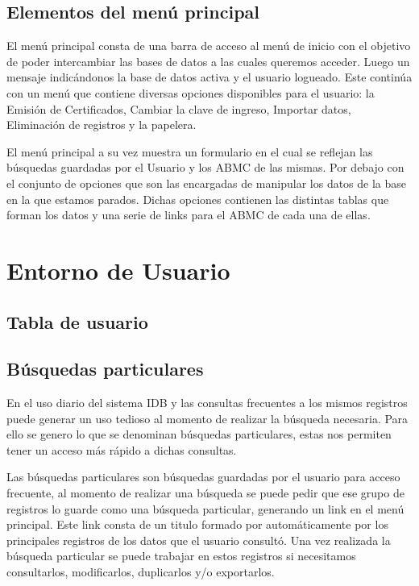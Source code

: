 \documentclass[a4paper,10pt]{article}
\begin{document}
\subsection{Elementos del menú principal}
El menú principal consta de una barra de acceso al menú de inicio con el objetivo de poder intercambiar las bases de datos a las cuales queremos acceder.
Luego un mensaje indicándonos la base de datos activa y el usuario logueado.
Este continúa con un menú que contiene diversas opciones disponibles para el usuario: la Emisión de Certificados, Cambiar la clave de ingreso, Importar datos, Eliminación de registros y la papelera.

El menú principal a su vez muestra un formulario en el cual se reflejan las búsquedas guardadas por el Usuario y los ABMC de las mismas.
Por debajo con el conjunto de opciones que son las encargadas de manipular los datos de la base en la que estamos parados.
Dichas opciones contienen las distintas tablas que forman los datos y una serie de links para el ABMC de cada una de ellas.



\section{Entorno de Usuario}
\subsection{Tabla de usuario}
\subsection{Búsquedas particulares}
En el uso diario del sistema IDB y las consultas frecuentes a los mismos registros puede generar un uso tedioso al momento de realizar la búsqueda necesaria. Para ello se genero lo que se denominan búsquedas particulares, estas nos permiten tener un acceso más rápido a dichas consultas.

Las búsquedas particulares son búsquedas guardadas por el usuario para acceso frecuente, al momento de realizar una búsqueda se puede pedir que ese grupo de registros lo guarde como una búsqueda particular, generando un link en el menú principal. Este link consta de un titulo formado por automáticamente por los principales registros  de los  datos que el usuario consultó. Una vez realizada la búsqueda particular se puede trabajar en estos registros si necesitamos consultarlos,  modificarlos, duplicarlos y/o exportarlos.
\end{document}
